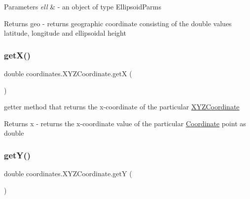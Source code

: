 \begin{DoxyParams}{Parameters}
{\em ell} & -\/ an object of type Ellipsoid\+Parms \\
\hline
\end{DoxyParams}
\begin{DoxyReturn}{Returns}
geo -\/ returns geographic coordinate consisting of the double values latitude, longitude and ellipsoidal height 
\end{DoxyReturn}
\mbox{\label{classcoordinates_1_1_x_y_z_coordinate_ab9055f02276f40c7c9bd0929544b31d4}} 
\subsubsection{\texorpdfstring{get\+X()}{getX()}}
{\footnotesize\ttfamily double coordinates.\+X\+Y\+Z\+Coordinate.\+getX (\begin{DoxyParamCaption}{ }\end{DoxyParamCaption})}



getter method that returns the x-\/coordinate of the particular \hyperlink{classcoordinates_1_1_x_y_z_coordinate}{X\+Y\+Z\+Coordinate} 

\begin{DoxyReturn}{Returns}
x -\/ returns the x-\/coordinate value of the particular \hyperlink{classcoordinates_1_1_coordinate}{Coordinate} point as double 
\end{DoxyReturn}
\mbox{\label{classcoordinates_1_1_x_y_z_coordinate_a5b1614c8fb0680235ff866695d56bfd0}} 
\subsubsection{\texorpdfstring{get\+Y()}{getY()}}
{\footnotesize\ttfamily double coordinates.\+X\+Y\+Z\+Coordinate.\+getY (\begin{DoxyParamCaption}{ }\end{DoxyParamCaption})}



